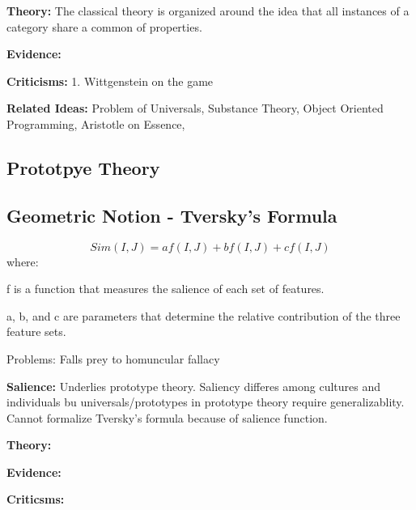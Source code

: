 \documentclass[twoside]{article}
\begin{document}
\textbf{Theory: } The classical theory is organized around the idea that all
instances of a category share a common  of properties.

\textbf{Evidence: }

\textbf{Criticisms: }
1. Wittgenstein on the game

\textbf{Related Ideas: } Problem of Universals, Substance Theory,
 Object Oriented Programming, Aristotle on Essence,

\subsection{Prototpye Theory}

\subsection{Geometric Notion - Tversky's Formula}
$$ Sim(I, J) = af(I, J) + bf(I, J) + cf(I, J) $$
where:

f is a function that measures the salience of each set of features.

a, b,  and  c are  parameters  that  determine the relative contribution
of the three feature sets.

Problems: Falls prey to homuncular fallacy

\textbf{Salience: } Underlies prototype theory. Saliency differes among
cultures and individuals bu universals/prototypes in prototype theory
require generalizablity. Cannot formalize Tversky's formula because of salience
function.

\textbf{Theory: }

\textbf{Evidence: }

\textbf{Criticsms: }
\end{document}

